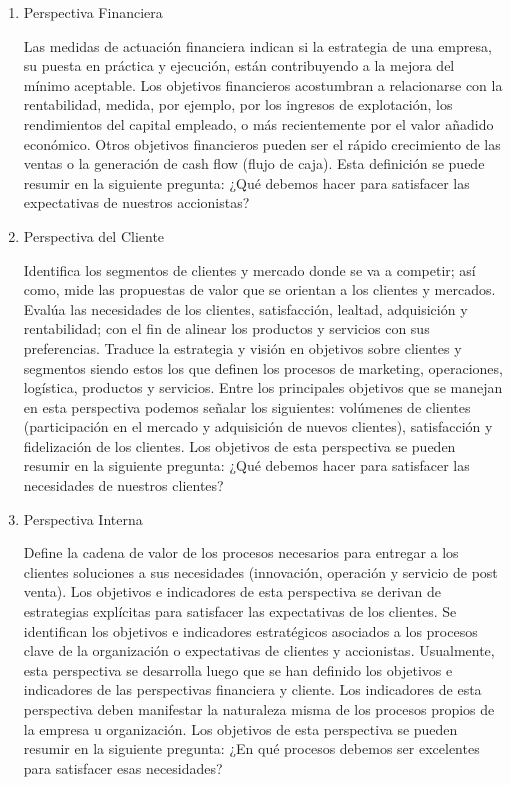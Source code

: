 \begin{enumerate}[a)]
		\begin{enumerate}[1.]
   		 \item Perspectiva Financiera

		Las medidas de actuación financiera indican si la estrategia de una empresa, su puesta en práctica y ejecución, están contribuyendo a la mejora del mínimo aceptable. Los objetivos financieros acostumbran a relacionarse con la rentabilidad, medida, por ejemplo, por los ingresos de explotación, los rendimientos del capital empleado, o más recientemente por el valor añadido económico. Otros objetivos financieros pueden ser el rápido crecimiento de las ventas o la generación de cash flow (flujo de caja). Esta definición se puede resumir en la siguiente pregunta: ¿Qué debemos hacer para satisfacer las expectativas de nuestros accionistas?

  		 \item Perspectiva del Cliente

		Identifica los segmentos de clientes y mercado donde se va a competir; así como, mide las propuestas de valor que se orientan a los clientes y mercados. Evalúa las necesidades de los clientes, satisfacción, lealtad, adquisición y rentabilidad; con el fin de alinear los productos y servicios con sus preferencias. Traduce la estrategia y visión en objetivos sobre clientes y segmentos siendo estos los que definen los procesos de marketing, operaciones, logística, productos y servicios.
Entre los principales objetivos que se manejan en esta perspectiva podemos señalar los siguientes: volúmenes de clientes (participación en el mercado y adquisición de nuevos clientes), satisfacción y fidelización de los clientes. Los objetivos de esta perspectiva se pueden resumir en la siguiente pregunta: ¿Qué debemos hacer para satisfacer las necesidades de nuestros clientes?

  		  \item Perspectiva Interna

		Define la cadena de valor de los procesos necesarios para entregar a los clientes soluciones a sus necesidades (innovación, operación y servicio de post venta). Los objetivos e indicadores de esta perspectiva se derivan de estrategias explícitas para satisfacer las expectativas de los clientes.
Se identifican los objetivos e indicadores estratégicos asociados a los procesos clave de la organización o expectativas de clientes y accionistas. Usualmente, esta perspectiva se desarrolla luego que se han definido los objetivos e indicadores de las perspectivas financiera y cliente. Los indicadores de esta perspectiva deben manifestar la naturaleza misma de los procesos propios de la empresa u organización. Los objetivos de esta perspectiva se pueden resumir en la siguiente pregunta: ¿En qué procesos debemos ser excelentes para satisfacer esas necesidades?


\end{enumerate}
\end{enumerate}
